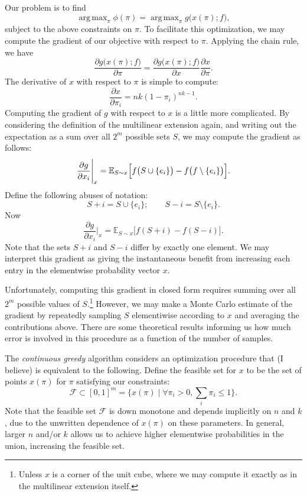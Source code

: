 \documentclass{article}
\newcommand{\cm}[1]{\mathcal{#1}}
\DeclareMathOperator*{\argmax}{arg\,max}
\begin{document}
Our problem is to find
\[
  \argmax_{\pi} \phi(\pi) = \argmax_{\pi} g\bigl(x(\pi); f\bigr),
\]
subject to the above constraints on $\pi$.  To facilitate this
optimization, we may compute the gradient of our objective with
respect to $\pi$.  Applying the chain rule, we have
\[
  \frac{\partial g\bigl(x(\pi); f\bigr)}{\partial \pi}
  =
  \frac{\partial g\bigl(x(\pi); f\bigr)}{\partial x}
  \frac{\partial x}{\partial \pi}.
\]
The derivative of $x$ with respect to $\pi$ is simple to compute:
\[
  \frac{\partial x}{\partial \pi_i}
  =
  nk(1 - \pi_i)^{nk - 1}.
\]
Computing the gradient of $g$ with respect to $x$ is a little more
complicated.  By considering the definition of the multilinear
extension again, and writing out the expectation as a sum over all
$2^m$ possible sets $S$, we may compute the gradient as follows:
\[
  \frac{\partial g}{\partial x_i}\Biggr\rvert_x
  =
  \mathbb{E}_{S \sim x}
  \Bigl[f\bigl(S \cup \{ e_i \}\bigr) - f\bigl(f \setminus \{e_i\}\bigr)\Bigr].
\]
Define the following abuses of notation:
\[
  S + i = S \cup      \{e_i\}; \qquad
  S - i = S \setminus \{e_i\}.
\]
Now
\[
  \frac{\partial g}{\partial x_i}\Biggr\rvert_x
  =
  \mathbb{E}_{S \sim x}\bigl[f(S + i) - f(S - i)\bigr].
\]
Note that the sets $S + i$ and $S - i$ differ by exactly one element.
We may interpret this gradient as giving the instantaneous benefit
from increasing each entry in the elementwise probability vector $x$.

Unfortunately, computing this gradient in closed form requires summing
over all $2^m$ possible values of $S$.\footnote{Unless $x$ is a corner
  of the unit cube, where we may compute it exactly as in the
  multilinear extension itself.}  However, we may make a Monte Carlo
estimate of the gradient by repeatedly sampling $S$ elementiwise
according to $x$ and averaging the contributions above.  There are
some theoretical results informing us how much error is involved in
this procedure as a function of the number of samples.

The \emph{continuous greedy} algorithm considers an optimization
procedure that (I believe) is equivalent to the following.  Define the
feasible set for $x$ to be the set of points $x(\pi)$ for $\pi$
satisfying our constraints:
\[
  \cm{F} \subset [0, 1]^m
  =
  \bigl\{x(\pi) \mid \forall \pi_i > 0, \sum_i \pi_i \leq 1 \bigr\}.
\]
Note that the feasible set $\cm{F}$ is down monotone and depends
implicitly on $n$ and $k$, due to the unwritten dependence of $x(\pi)$
on these parameters.  In general, larger $n$ and/or $k$ allows us
to achieve higher elementwise probabilities in the union, increasing
the feasible set.
\end{document}
